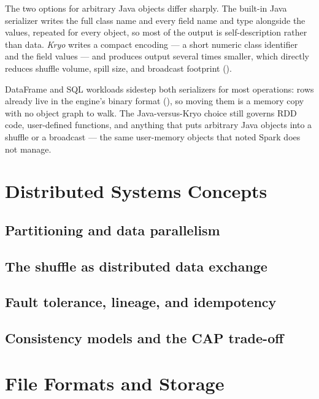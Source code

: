 The two options for arbitrary Java objects differ sharply. The built-in Java
serializer writes the full class name and every field name and type alongside the
values, repeated for every object, so most of the output is self-description
rather than data. \emph{Kryo} writes a compact encoding --- a short numeric class
identifier and the field values --- and produces output several times smaller,
which directly reduces shuffle volume, spill size, and broadcast footprint
().

DataFrame and SQL workloads sidestep both serializers for most operations: rows
already live in the engine's binary format (), so moving
them is a memory copy with no object graph to walk. The Java-versus-Kryo choice
still governs RDD code, user-defined functions, and anything that puts arbitrary
Java objects into a shuffle or a broadcast --- the same user-memory objects that
 noted Spark does not manage.

\section{Distributed Systems Concepts}
\label{sec:prereq-distsys}

\subsection{Partitioning and data parallelism}
\tbd

\subsection{The shuffle as distributed data exchange}
\tbd

\subsection{Fault tolerance, lineage, and idempotency}
\tbd

\subsection{Consistency models and the CAP trade-off}
\tbd

\section{File Formats and Storage}
\label{sec:prereq-formats}

